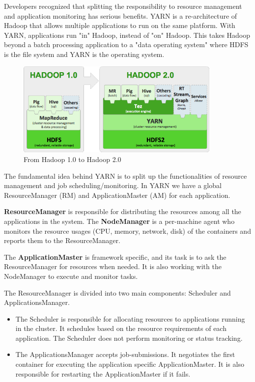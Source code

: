 Developers recognized that splitting the responsibility to resource management and application monitoring has serious benefits. YARN is a re-architecture of Hadoop that allows multiple applications to run on the same platform. With YARN, applications run "in" Hadoop, instead of "on" Hadoop. This takes Hadoop beyond a batch processing application to a "data operating system" where HDFS is the file system and YARN is the operating system. 

\begin{figure}[H]
	\includegraphics[width=100mm, keepaspectratio]{figures/hadoop10vs20.png}
	\centering
	\caption{From Hadoop 1.0 to Hadoop 2.0}
	\centering
\end{figure}

The fundamental idea behind YARN is to split up the functionalities of resource management and job scheduling/monitoring. In YARN we have a global ResourceManager (RM) and ApplicationMaster (AM) for each application.

\textbf{ResourceManager} is responsible for distributing the resources among all the applications in the system. The \textbf{NodeManager} is a per-machine agent who monitors the resource usages (CPU, memory, network, disk) of the containers and reports them to the ResourceManager. 

The \textbf{ApplicationMaster} is framework specific, and its task is to ask the ResourceManager for resources when needed. It is also working with the NodeManager to execute and monitor tasks.

The ResourceManager is divided into two main components: Scheduler and ApplicationsManager.
\begin{itemize}
	\item The Scheduler is responsible for allocating resources to applications running in the cluster. It schedules based on the resource requirements of each application. The Scheduler does not perform monitoring or status tracking.
	\item The ApplicationsManager accepts job-submissions. It negotiates the first container for executing the application specific ApplicationMaster. It is also responsible for restarting the ApplicationMaster if it fails. 
\end{itemize}

